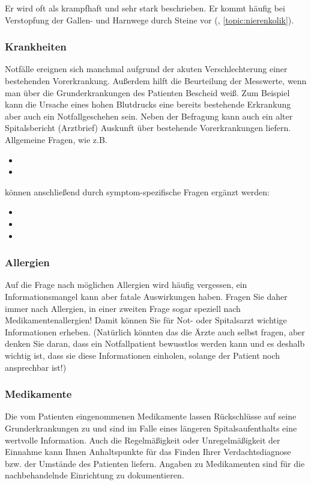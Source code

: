 
Er wird oft als krampfhaft und sehr stark beschrieben. Er
kommt häufig bei Verstopfung der Gallen- und Harnwege durch
Steine vor (,
\ref{topic:nierenkolik}).

\subsubsection{Krankheiten}
Notfälle ereignen sich manchmal aufgrund der akuten Verschlechterung einer
bestehenden Vorerkrankung. Außerdem hilft die Beurteilung der Messwerte, wenn man
über die Grunderkrankungen des Patienten Bescheid weiß. Zum Beispiel kann die
Ursache eines hohen Blutdrucks eine bereits bestehende Erkrankung aber auch ein
Notfallgeschehen sein. Neben der Befragung kann auch ein alter Spitalsbericht
(Arztbrief) Auskunft über bestehende Vorerkrankungen liefern. Allgemeine Fragen,
wie z.B.
\begin{itemize}
    \item {}
    \item {}
\end{itemize}
können anschließend durch symptom-spezifische Fragen ergänzt werden:
\begin{itemize}
    \item {}
    \item {}
    \item {}
\end{itemize}

\subsubsection{Allergien}
Auf die Frage nach möglichen Allergien wird häufig vergessen, ein
Informationsmangel kann aber fatale Auswirkungen haben. Fragen Sie daher immer
nach Allergien, in einer zweiten Frage sogar speziell nach Medikamentenallergien!
Damit können Sie für Not- oder Spitalsarzt wichtige Informationen erheben.
(Natürlich könnten das die Ärzte auch selbst fragen, aber denken Sie daran, dass
ein Notfallpatient bewusstlos werden kann und es deshalb wichtig ist, dass sie
diese Informationen einholen, solange der Patient noch ansprechbar ist!)

\subsubsection{Medikamente}
Die vom Patienten eingenommenen Medikamente lassen
Rückschlüsse auf seine Grunderkrankungen zu und sind im Falle
eines längeren Spitalsaufenthalts eine wertvolle Information.
Auch die Regelmäßigkeit oder Unregelmäßigkeit der Einnahme
kann Ihnen Anhaltspunkte für das Finden Ihrer
Verdachtsdiagnose bzw. der Umstände des Patienten liefern. Angaben zu
Medikamenten sind für die nachbehandelnde Einrichtung zu dokumentieren. 

